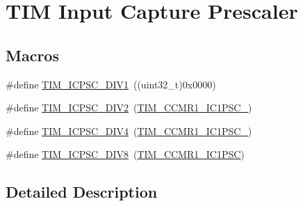 \hypertarget{group___t_i_m___input___capture___prescaler}{\section{T\-I\-M Input Capture Prescaler}
\label{group___t_i_m___input___capture___prescaler}
}
\subsection*{Macros}
\begin{DoxyCompactItemize}
\item 
\#define \hyperlink{group___t_i_m___input___capture___prescaler_ga8acb44abe3147d883685c1f9f1ce410e}{T\-I\-M\-\_\-\-I\-C\-P\-S\-C\-\_\-\-D\-I\-V1}~((uint32\-\_\-t)0x0000)
\item 
\#define \hyperlink{group___t_i_m___input___capture___prescaler_ga1d8a7b66add914e2ddd910d2d700978f}{T\-I\-M\-\_\-\-I\-C\-P\-S\-C\-\_\-\-D\-I\-V2}~(\hyperlink{group___peripheral___registers___bits___definition_ga05673358a44aeaa56daefca67341b29d}{T\-I\-M\-\_\-\-C\-C\-M\-R1\-\_\-\-I\-C1\-P\-S\-C\-\_})
\item 
\#define \hyperlink{group___t_i_m___input___capture___prescaler_gaf5a675046430fa0f0c95b0dac612828f}{T\-I\-M\-\_\-\-I\-C\-P\-S\-C\-\_\-\-D\-I\-V4}~(\hyperlink{group___peripheral___registers___bits___definition_gaf42b75da9b2f127dca98b6ca616f7add}{T\-I\-M\-\_\-\-C\-C\-M\-R1\-\_\-\-I\-C1\-P\-S\-C\-\_})
\item 
\#define \hyperlink{group___t_i_m___input___capture___prescaler_ga5086cb03c89a5c67b199d20b605f00cb}{T\-I\-M\-\_\-\-I\-C\-P\-S\-C\-\_\-\-D\-I\-V8}~(\hyperlink{group___peripheral___registers___bits___definition_gab46b7186665f5308cd2ca52acfb63e72}{T\-I\-M\-\_\-\-C\-C\-M\-R1\-\_\-\-I\-C1\-P\-S\-C})
\end{DoxyCompactItemize}


\subsection{Detailed Description}


